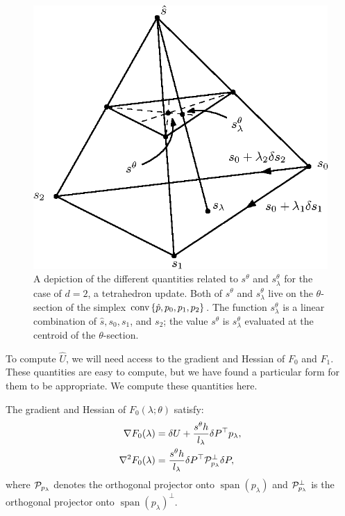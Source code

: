 \documentclass[sisc-eikonal.tex]{subfiles}
\begin{document}
\begin{figure}
  \centering
  \includegraphics{speed-tetra.eps}
  \caption{A depiction of the different quantities related to
    $s^{\theta}$ and $s^{\theta}_\lambda$ for the case of $d = 2$, a
    tetrahedron update. Both of $s^\theta$ and $s^\theta_\lambda$ live
    on the $\theta$-section of the simplex
    $\operatorname{conv} \left\{\hat{p}, p_0, p_1, p_2\right\}$. The function
    $s^\theta_\lambda$ is a linear combination of $\hat{s}, s_0, s_1$,
    and $s_2$; the value $s^\theta$ is $s^\theta_\lambda$ evaluated at
    the centroid of the $\theta$-section.}
\end{figure}

To compute $\hat{U}$, we will need access to the gradient and Hessian
of $F_0$ and $F_1$. These quantities are easy to compute, but we have
found a particular form for them to be appropriate. We compute these
quantities here.

\begin{lemma}\label{lemma:F0-grad-and-Hess}
  The gradient and Hessian of $F_0(\lambda; \theta)$ satisfy:
  \begin{align}
    \nabla F_0(\lambda) &= \delta U + \frac{s^{\theta} h}{l_\lambda} \delta P^\top p_\lambda,\label{eq:F0-grad} \\
    \nabla^2 F_0(\lambda) &= \frac{s^{\theta} h}{l_\lambda} \delta P^\top \calP^\perp_{p_\lambda} \delta P,
  \end{align}
  where $\mathcal{P}_{p_\lambda}$ denotes the orthogonal projector onto
  $\operatorname{span}(p_\lambda)$ and $\mathcal{P}_{p_\lambda}^\perp$ is
  the orthogonal projector onto
  $\operatorname{span}(p_\lambda)^\perp$.
\end{lemma}
\end{document}

